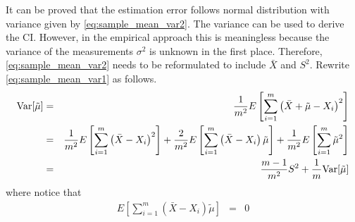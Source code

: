 It can be proved that the estimation error follows normal distribution with variance given by \eqref{eq:sample_mean_var2}. The variance can be used to derive the CI. However, in the empirical approach this is meaningless because the variance of the measurements $\sigma^2$ is unknown in the first place. Therefore, \eqref{eq:sample_mean_var2} needs to be reformulated to include $\bar{X}$ and $S^2$. Rewrite \eqref{eq:sample_mean_var1} as follows.
\begin{eqnarray}
	\textup{Var}[\tilde{\mu}] &=& \dfrac{1}{m^2}E\left[\sum_{i=1}^{m}\left(\bar{X}+\tilde{\mu}-X_i\right)^2\right] \nonumber \\
	&=& \dfrac{1}{m^2}E\left[\sum_{i=1}^{m}\left(\bar{X}-X_i\right)^2\right] + \dfrac{2}{m^2}E\left[\sum_{i=1}^{m}\left(\bar{X}-X_i\right)\tilde{\mu}\right] + \dfrac{1}{m^2}E\left[\sum_{i=1}^{m}\tilde{\mu}^2\right] \nonumber \\
	&=& \dfrac{m-1}{m^2}S^2 + \dfrac{1}{m}\textup{Var}[\tilde{\mu}] \label{eq:sample_mean_var3}
\end{eqnarray}
where notice that
\begin{eqnarray}
    E\left[\sum_{i=1}^{m}\left(\bar{X}-X_i\right)\tilde{\mu}\right] &=& 0 \nonumber
\end{eqnarray}

